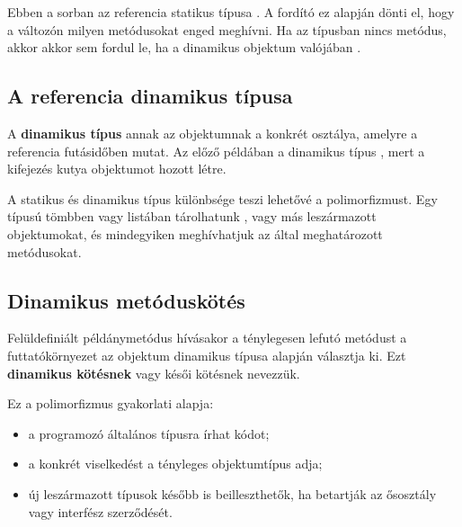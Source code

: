 Ebben a sorban az  referencia statikus típusa . A fordító ez alapján dönti el, hogy a változón milyen metódusokat enged meghívni. Ha az  típusban nincs  metódus, akkor  akkor sem fordul le, ha a dinamikus objektum valójában .

\subsection{A referencia dinamikus típusa}

A \textbf{dinamikus típus} annak az objektumnak a konkrét osztálya, amelyre a referencia futásidőben mutat. Az előző példában a dinamikus típus , mert a  kifejezés kutya objektumot hozott létre.

A statikus és dinamikus típus különbsége teszi lehetővé a polimorfizmust. Egy  típusú tömbben vagy listában tárolhatunk ,  vagy más  leszármazott objektumokat, és mindegyiken meghívhatjuk az  által meghatározott metódusokat.

\subsection{Dinamikus metóduskötés}

Felüldefiniált példánymetódus hívásakor a ténylegesen lefutó metódust a futtatókörnyezet az objektum dinamikus típusa alapján választja ki. Ezt \textbf{dinamikus kötésnek} vagy késői kötésnek nevezzük.

Ez a polimorfizmus gyakorlati alapja:

\begin{itemize}
  \item a programozó általános típusra írhat kódot;
  \item a konkrét viselkedést a tényleges objektumtípus adja;
  \item új leszármazott típusok később is beilleszthetők, ha betartják az ősosztály vagy interfész szerződését.
\end{itemize}

\begin{center}

\end{center}




